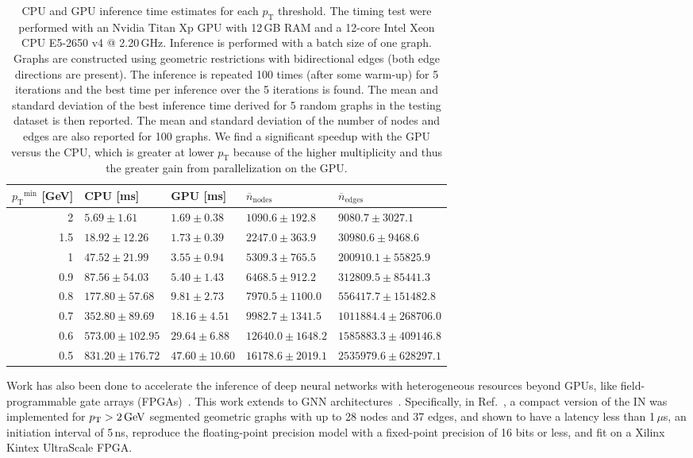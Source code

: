 \documentclass[twocolumn]{svjour3}
\newcommand{\pt}{\ensuremath{p_{\mathrm{T}}}\xspace}
\newcommand{\GeV}{\ensuremath{\,\text{Ge\hspace{-.08em}V}}\xspace}
\begin{document}
\begin{table}
\centering
\caption{CPU and GPU inference time estimates for each $\pt$ threshold. 
The timing test were performed with an Nvidia Titan Xp GPU with 12\,GB RAM and a 12-core Intel Xeon CPU E5-2650 v4 @ 2.20\,GHz.
Inference is performed with a batch size of one graph. 
Graphs are constructed using geometric restrictions with bidirectional edges (both edge directions are present).
The inference is repeated 100 times (after some warm-up) for 5 iterations and the best time per inference over the 5 iterations is found.
The mean and standard deviation of the best inference time derived for 5 random graphs in the testing dataset is then reported.
The mean and standard deviation of the number of nodes and edges are also reported for 100 graphs.
We find a significant speedup with the GPU versus the CPU, which is greater at lower \pt because of the higher multiplicity and thus the greater gain from parallelization on the GPU.}
\label{tab:timing}      
\begin{tabular}{ r|llll }
$\pt^\mathrm{min}$ [GeV] & CPU [ms] & GPU [ms] & $\overline{n}_\mathrm{nodes}$ & $\overline{n}_\mathrm{edges}$ \\\hline
 2  &  $5.69 \pm 1.61$ &  $1.69 \pm 0.38$ & $1090.6 \pm 192.8$ & $9080.7 \pm 3027.1$ \\
 1.5  & $18.92 \pm 12.26$ & $1.73 \pm 0.39$ & $2247.0 \pm 363.9$ & $30980.6 \pm 9468.6$\\
  1  & $47.52 \pm 21.99$ & $3.55 \pm 0.94$ & $5309.3 \pm 765.5$ & $200910.1 \pm 55825.9$ \\
 0.9 & $87.56 \pm 54.03$ & $5.40 \pm 1.43$ & $6468.5 \pm 912.2$ & $312809.5 \pm 85441.3$ \\
 0.8 & $177.80 \pm 57.68$ & $9.81 \pm 2.73$ & $7970.5 \pm 1100.0$  &  $556417.7 \pm 151482.8$\\
 0.7 & $352.80 \pm 89.69$ & $18.16 \pm 4.51$ &  $9982.7 \pm 1341.5$ & $1011884.4 \pm 268706.0$\\
 0.6  & $573.00 \pm 102.95$ & $29.64 \pm 6.88$ & $12640.0 \pm 1648.2$ & $1585883.3 \pm 409146.8$ \\
 0.5  & $831.20 \pm 176.72$ &  $47.60 \pm 10.60$& $16178.6 \pm 2019.1$ &  $2535979.6 \pm 628297.1$\\
\end{tabular}
\end{table}

Work has also been done to accelerate the inference of deep neural networks with heterogeneous resources beyond GPUs, like field-programmable gate arrays (FPGAs)~\cite{FINN,FINNR,fpgadeep,fpgaover,Duarte:2018ite,Summers:2020xiy,bnnpaper,Coelho:2020zfu,Aarrestad:2021zos}.
This work extends to GNN architectures~\cite{Iiyama:2020wap,IN_fpga}.
Specifically, in Ref.~\cite{IN_fpga}, a compact version of the IN was implemented for $\pt > 2\GeV$ segmented geometric graphs with up to 28 nodes and 37 edges, and shown to have a latency less than 1\,$\mu$s, an initiation interval of 5\,ns, reproduce the floating-point precision model with a fixed-point precision of 16 bits or less, and fit on a Xilinx Kintex UltraScale FPGA. 
\end{document}
